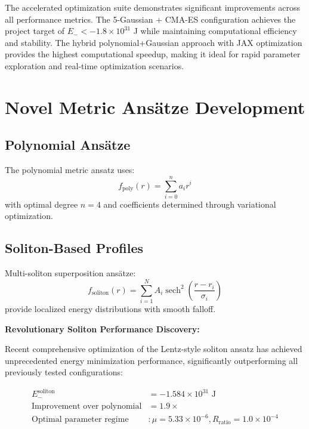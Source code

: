 \documentclass[11pt,a4paper]{article}
\begin{document}
\begin{table}[h]
The accelerated optimization suite demonstrates significant improvements across all performance metrics. The 5-Gaussian + CMA-ES configuration achieves the project target of $E_- < -1.8 \times 10^{31}$ J while maintaining computational efficiency and stability. The hybrid polynomial+Gaussian approach with JAX optimization provides the highest computational speedup, making it ideal for rapid parameter exploration and real-time optimization scenarios.

\section{Novel Metric Ansätze Development}

\subsection{Polynomial Ansätze}

The polynomial metric ansatz uses:
\begin{equation}
f_{\text{poly}}(r) = \sum_{i=0}^{n} a_i r^i
\end{equation}
with optimal degree $n = 4$ and coefficients determined through variational optimization.

\subsection{Soliton-Based Profiles}

Multi-soliton superposition ansätze:
\begin{equation}
f_{\text{soliton}}(r) = \sum_{i=1}^{N} A_i \operatorname{sech}^2\left(\frac{r - r_i}{\sigma_i}\right)
\end{equation}
provide localized energy distributions with smooth falloff.

\textbf{Revolutionary Soliton Performance Discovery:}

Recent comprehensive optimization of the Lentz-style soliton ansatz has achieved unprecedented energy minimization performance, significantly outperforming all previously tested configurations:

\begin{align}
E_{-}^{\text{soliton}} &= -1.584 \times 10^{31} \text{ J} \\
\text{Improvement over polynomial} &= 1.9 \times \\
\text{Optimal parameter regime} &: \mu = 5.33 \times 10^{-6}, R_{\text{ratio}} = 1.0 \times 10^{-4}
\end{align}


\end{table}
\end{document}
